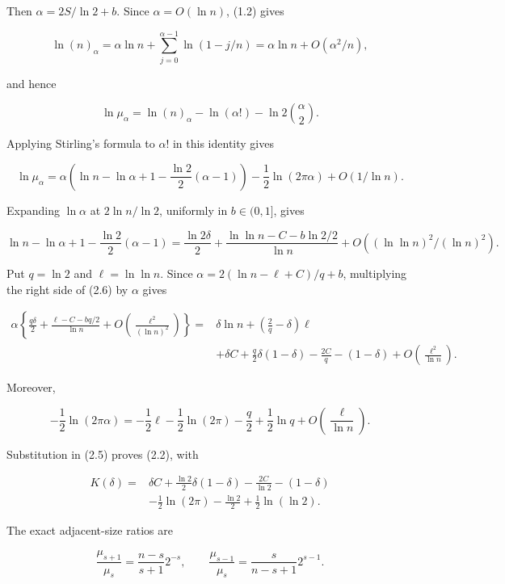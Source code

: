 \documentclass[11pt,reqno]{amsart}
\begin{document}
Then \(\alpha=2S/{\ln 2}+b\). Since \(\alpha=O({\ln n})\), (1.2) gives

\[
 \ln(n)_\alpha=\alpha {\ln n}+
 \sum_{j=0}^{\alpha-1}\ln(1-j/n)
 =\alpha {\ln n}+O(\alpha^2/n),
\]

and hence

\[
 \ln\mu_\alpha
 =\ln(n)_\alpha-\ln(\alpha!)
   -{\ln 2}\binom{\alpha}{2}.
\]

Applying Stirling's formula to \(\alpha!\) in this identity gives

\[
 \ln\mu_\alpha
 =\alpha\left({\ln n}-\ln\alpha+1-\frac {\ln 2}2(\alpha-1)\right)
  -\frac12\ln(2\pi\alpha)+O(1/{\ln n}).                       \tag{2.5}
\]

Expanding \(\ln \alpha\) at \(2{\ln n}/{\ln 2}\), uniformly in
\(b \in (0,1]\), gives

\[
 {\ln n}-\ln\alpha+1-\frac {\ln 2}2(\alpha-1)
 =\frac{{\ln 2}\delta}{2}
  +\frac{{\ln\ln n}-C-b{\ln 2}/2}{{\ln n}}+O((\ln\ln n)^2/(\ln n)^2).                        \tag{2.6}
\]

Put \(q=\ln 2\) and \(\ell=\ln\ln n\). Since
\(\alpha=2(\ln n-\ell+C)/q+b\), multiplying the right side of
(2.6) by \(\alpha\) gives

\[
\begin{split}
\alpha\left\{\frac{q\delta}{2}
 +\frac{\ell-C-bq/2}{\ln n}
 +O\!\left(\frac{\ell^2}{(\ln n)^2}\right)\right\}
={}&\delta\ln n+\left(\frac2q-\delta\right)\ell\\
&+\delta C+\frac q2\delta(1-\delta)-\frac{2C}{q}
 -(1-\delta)+O\!\left(\frac{\ell^2}{\ln n}\right).
\end{split}
\]

Moreover,

\[
 -\frac12\ln(2\pi\alpha)
 =-\frac12\ell-\frac12\ln(2\pi)-\frac q2
   +\frac12\ln q+O\!\left(\frac{\ell}{\ln n}\right).
\]

Substitution in (2.5) proves (2.2), with

\[
\begin{split}
 K(\delta)={}&\delta C+\frac {\ln 2}2\delta(1-\delta)-\frac{2C}{{\ln 2}}
 -(1-\delta)\\
 &-\frac12\ln(2\pi)-\frac {\ln 2}2+\frac12\ln(\ln 2).
\end{split}                                               \tag{2.7}
\]

The exact adjacent-size ratios are

\[
 \frac{\mu_{s+1}}{\mu_s}
 =\frac{n-s}{s+1}2^{-s},\qquad
 \frac{\mu_{s-1}}{\mu_s}
 =\frac{s}{n-s+1}2^{s-1}.                                \tag{2.8}
\]
\end{document}
